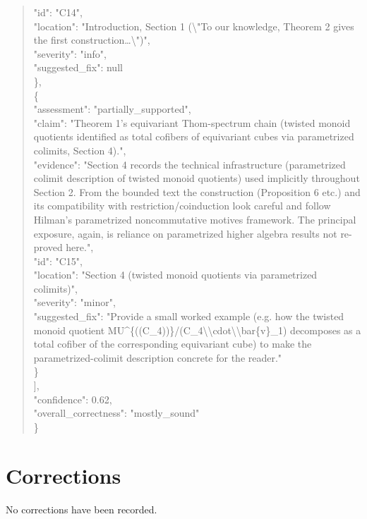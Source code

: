 \documentclass[11pt]{article}
\begin{document}
\begin{quote}
      "id": "C14",\\
      "location": "Introduction, Section 1 (\textbackslash{}"To our knowledge, Theorem 2 gives the first construction…\textbackslash{}")",\\
      "severity": "info",\\
      "suggested\_fix": null\\
    \},\\
    \{\\
      "assessment": "partially\_supported",\\
      "claim": "Theorem 1's equivariant Thom-spectrum chain (twisted monoid quotients identified as total cofibers of equivariant cubes via parametrized colimits, Section 4).",\\
      "evidence": "Section 4 records the technical infrastructure (parametrized colimit description of twisted monoid quotients) used implicitly throughout Section 2. From the bounded text the construction (Proposition 6 etc.) and its compatibility with restriction/coinduction look careful and follow Hilman's parametrized noncommutative motives framework. The principal exposure, again, is reliance on parametrized higher algebra results not re-proved here.",\\
      "id": "C15",\\
      "location": "Section 4 (twisted monoid quotients via parametrized colimits)",\\
      "severity": "minor",\\
      "suggested\_fix": "Provide a small worked example (e.g. how the twisted monoid quotient MU\^{}\{((C\_4))\}/(C\_4\textbackslash{}\textbackslash{}cdot\textbackslash{}\textbackslash{}bar\{v\}\_1) decomposes as a total cofiber of the corresponding equivariant cube) to make the parametrized-colimit description concrete for the reader."\\
    \}\\
  ],\\
  "confidence": 0.62,\\
  "overall\_correctness": "mostly\_sound"\\
\}\\
\end{quote}

\section*{Corrections}
No corrections have been recorded.
\end{document}
